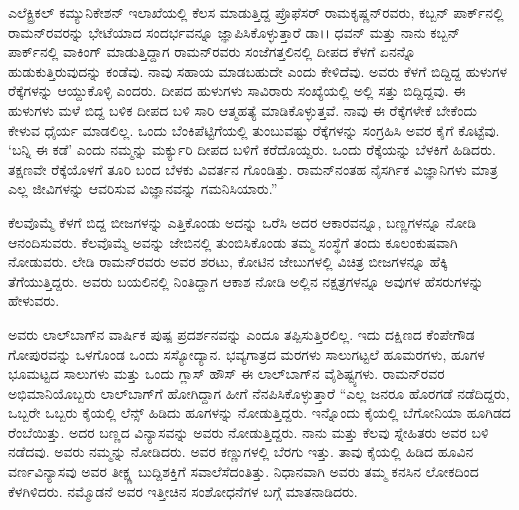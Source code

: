 ಎಲೆಕ್ಟ್ರಿಕಲ್ ಕಮ್ಯುನಿಕೇಶನ್ ಇಲಾಖೆಯಲ್ಲಿ ಕೆಲಸ ಮಾಡುತ್ತಿದ್ದ ಪ್ರೊಫೆಸರ್ ರಾಮಕೃಷ್ಣನ್‌ರವರು, ಕಬ್ಬನ್ ಪಾರ್ಕ್‌ನಲ್ಲಿ ರಾಮನ್‌ರವರನ್ನು ಭೇಟೆಯಾದ ಸಂದರ್ಭವನ್ನೂ ಜ್ಞಾಪಿಸಿಕೊಳ್ಳುತ್ತಾರೆ \enginline{--} ಡಾ।। ಧವನ್ ಮತ್ತು ನಾನು ಕಬ್ಬನ್ ಪಾರ್ಕ್‌ನಲ್ಲಿ ವಾಕಿಂಗ್ ಮಾಡುತ್ತಿದ್ದಾಗ ರಾಮನ್‌ರವರು ಸಂಜೆಗತ್ತಲಿನಲ್ಲಿ ದೀಪದ ಕೆಳಗೆ ಏನನ್ನೊ ಹುಡುಕುತ್ತಿರುವುದನ್ನು ಕಂಡೆವು. ನಾವು ಸಹಾಯ ಮಾಡಬಹುದೇ ಎಂದು ಕೇಳಿದೆವು. ಅವರು ಕೆಳಗೆ ಬಿದ್ದಿದ್ದ ಹುಳುಗಳ ರೆಕ್ಕೆಗಳನ್ನು ಆಯ್ದುಕೊಳ್ಳಿ ಎಂದರು. ದೀಪದ ಹುಳುಗಳು ಸಾವಿರಾರು ಸಂಖ್ಯೆಯಲ್ಲಿ ಅಲ್ಲಿ ಸತ್ತು ಬಿದ್ದಿದ್ದವು. ಈ ಹುಳುಗಳು ಮಳೆ ಬಿದ್ದ ಬಳಿಕ ದೀಪದ ಬಳಿ ಸಾರಿ ಆತ್ಮಹತ್ಯೆ ಮಾಡಿಕೊಳ್ಳುತ್ತವೆ. ನಾವು ಈ ರೆಕ್ಕೆಗಳೇಕೆ ಬೇಕೆಂದು ಕೇಳುವ ಧೈರ್ಯ ಮಾಡಲಿಲ್ಲ. ಒಂದು ಬೆಂಕಿಪೆಟ್ಟಿಗೆಯಲ್ಲಿ ತುಂಬುವಷ್ಟು ರೆಕ್ಕೆಗಳನ್ನು ಸಂಗ್ರಹಿಸಿ ಅವರ ಕೈಗೆ ಕೊಟ್ಟೆವು. ‘ಬನ್ನಿ ಈ ಕಡೆ’ ಎಂದು ನಮ್ಮನ್ನು ಮರ್ಕ್ಯುರಿ ದೀಪದ ಬಳಿಗೆ ಕರೆದೊಯ್ದರು. ಒಂದು ರೆಕ್ಕೆಯನ್ನು ಬೆಳಕಿಗೆ ಹಿಡಿದರು. ತಕ್ಷಣವೇ ರೆಕ್ಕೆಯೊಳಗೆ ತೂರಿ ಬಂದ ಬೆಳಕು ವಿವರ್ತನ ಗೊಂಡಿತ್ತು. ರಾಮನ್‌ನಂತಹ ನೈಸರ್ಗಿಕ ವಿಜ್ಞಾನಿಗಳು ಮಾತ್ರ ಎಲ್ಲ ಜೀವಿಗಳನ್ನು ಆವರಿಸುವ ವಿಜ್ಞಾನವನ್ನು ಗಮನಿಸಿಯಾರು.” 

ಕೆಲವೊಮ್ಮೆ ಕೆಳಗೆ ಬಿದ್ದ ಬೀಜಗಳನ್ನು ಎತ್ತಿಕೊಂಡು ಅದನ್ನು ಒರೆಸಿ ಅದರ ಆಕಾರವನ್ನೂ, ಬಣ್ಣಗಳನ್ನೂ ನೋಡಿ ಆನಂದಿಸುವರು. ಕೆಲವೊಮ್ಮೆ ಅವನ್ನು ಜೇಬಿನಲ್ಲಿ ತುಂಬಿಸಿಕೊಂಡು ತಮ್ಮ ಸಂಸ್ಥೆಗೆ ತಂದು ಕೂಲಂಕುಷವಾಗಿ ನೋಡುವರು. ಲೇಡಿ ರಾಮನ್‌ರವರು ಅವರ ಶರಟು, ಕೋಟಿನ ಜೇಬುಗಳಲ್ಲಿ ವಿಚಿತ್ರ ಬೀಜಗಳನ್ನೂ ಹೆಕ್ಕಿ ತೆಗೆಯುತ್ತಿದ್ದರು. ಅವರು ಬಯಲಿನಲ್ಲಿ ನಿಂತಿದ್ದಾಗ ಆಕಾಶ ನೋಡಿ ಅಲ್ಲಿನ ನಕ್ಷತ್ರಗಳನ್ನೂ ಅವುಗಳ ಹೆಸರುಗಳನ್ನು ಹೇಳುವರು. 

ಅವರು ಲಾಲ್‌ಬಾಗ್‍ನ ವಾರ್ಷಿಕ ಪುಷ್ಪ ಪ್ರದರ್ಶನವನ್ನು ಎಂದೂ ತಪ್ಪಿಸುತ್ತಿರಲಿಲ್ಲ. ಇದು ದಕ್ಷಿಣದ ಕೆಂಪೇಗೌಡ ಗೋಪುರವನ್ನು ಒಳಗೊಂಡ ಒಂದು ಸಸ್ಯೋದ್ಯಾನ. ಭವ್ಯಗಾತ್ರದ ಮರಗಳು ಸಾಲುಗಟ್ಟಲೆ ಹೂಮರಗಳು, ಹೂಗಳ ಭೂಮಟ್ಟದ ಸಾಲುಗಳು ಮತ್ತು ಒಂದು ಗ್ಲಾಸ್ ಹೌಸ್ ಈ ಲಾಲ್‌ಬಾಗ್‍‌ನ ವೈಶಿಷ್ಟ್ಯಗಳು. ರಾಮನ್‌ರವರ ಅಭಿಮಾನಿಯೊಬ್ಬರು ಲಾಲ್‌ಬಾಗ್‌ಗೆ ಹೋಗಿದ್ದಾಗ ಹೀಗೆ ನೆನಪಿಸಿಕೊಳ್ಳುತ್ತಾರೆ\enginline{--} “ಎಲ್ಲ ಜನರೂ ಹೊರಗಡೆ ನಡೆದಿದ್ದರು, ಒಬ್ಬರೇ ಒಬ್ಬರು ಕೈಯಲ್ಲಿ ಲೆನ್ಸ್ ಹಿಡಿದು ಹೂಗಳನ್ನು ನೋಡುತ್ತಿದ್ದರು. ಇನ್ನೊಂದು ಕೈಯಲ್ಲಿ ಬೆಗೋನಿಯಾ ಹೂಗಿಡದ ರೆಂಬೆಯಿತ್ತು. ಅದರ ಬಣ್ಣದ ವಿನ್ಯಾಸವನ್ನು ಅವರು ನೋಡುತ್ತಿದ್ದರು. ನಾನು ಮತ್ತು ಕೆಲವು ಸ್ನೇಹಿತರು ಅವರ ಬಳಿ ನಡೆದವು. ಅವರು ನಮ್ಮನ್ನು ನೋಡಿದರು. ಅವರ ಕಣ್ಣುಗಳಲ್ಲಿ ಬೆರಗು ಇತ್ತು. ತಾವು ಕೈಯಲ್ಲಿ ಹಿಡಿದ ಹೂವಿನ ವರ್ಣವಿನ್ಯಾಸವು ಅವರ ತೀಕ್ಷ್ಣ ಬುದ್ದಿಶಕ್ತಿಗೆ ಸವಾಲೆಸೆದಂತಿತ್ತು. ನಿಧಾನವಾಗಿ ಅವರು ತಮ್ಮ ಕನಸಿನ ಲೋಕದಿಂದ ಕೆಳಗಿಳಿದರು. ನಮ್ಮೊಡನೆ ಅವರ ಇತ್ತೀಚಿನ ಸಂಶೋಧನೆಗಳ ಬಗ್ಗೆ ಮಾತನಾಡಿದರು. 

